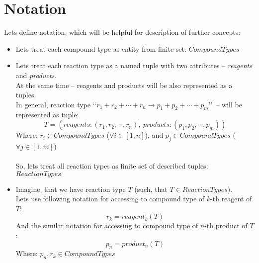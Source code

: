 \documentclass[10pt]{article}
\begin{document}
\newpage

\section{Notation}

\noindent Lets define notation, which will be helpful for description of further concepts:
\begin{itemize}

    \item Lets treat each compound type as entity from finite set: $CompoundTypes$

    \item Lets treat each reaction type as a named tuple with two attributes -- \emph{reagents} and \emph{products}. \\
             At the same time -- reagents and products will be also represented as a tuples. \\
             In general, reaction type \lq \lq$r_1 + r_2 + \cdots + r_n \rightarrow p_1 + p_2 + \cdots + p_m$\rq \rq \ -- will be represented as tuple:
             \begin{equation} \label{eq:reaction_type_notation}
                 T = (reagents:(r_1, r_2, \cdots , r_n),\ products:(p_1, p_2, \cdots , p_m))
             \end{equation}
             Where: $r_i \in CompoundTypes$ ($\forall i \in [1, n]$), and $p_j \in CompoundTypes$ ($\forall j \in [1, m]$) \\ \\
             So, lets treat all reaction types as finite set of described tuples: $ReactionTypes$

    \item Imagine, that we have reaction type $T$ (such, that $T \in ReactionTypes$). \\
             Lets use following notation for accessing to compound type of $k$-th reagent of $T$:
             \begin{equation} \label{eq:access_reagent_type_notation}
                 r_k = reagent_k(T)
             \end{equation}   
             And the similar notation for accessing to compound type of $n$-th product of $T$:
             \begin{equation} \label{eq:access_product_type_notation}
                 p_n = product_n(T)
             \end{equation}   
             Where: $p_n, r_k \in CompoundTypes$

\end{itemize}
\end{document}
